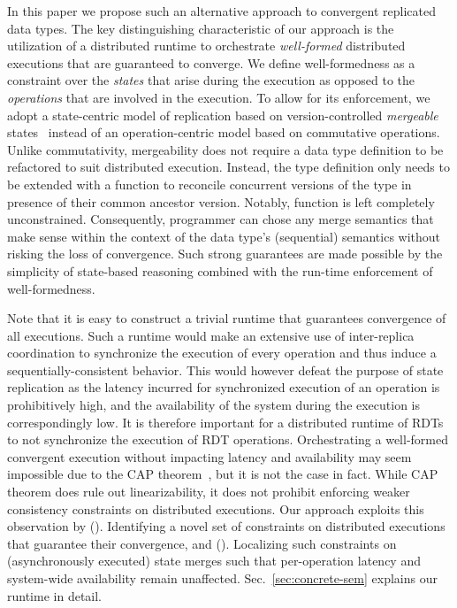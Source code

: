 In this paper we propose such an alternative approach to convergent
replicated data types. The key distinguishing characteristic of our
approach is the utilization of a distributed runtime to orchestrate
\emph{well-formed} distributed executions that are guaranteed to
converge. We define well-formedness as a constraint over the
\emph{states} that arise during the execution as opposed to the
\emph{operations} that are involved in the execution. To allow for its
enforcement, we adopt a state-centric model of replication based on
version-controlled \emph{mergeable} states~\cite{mrdt} instead of an
operation-centric model based on commutative operations. Unlike
commutativity, mergeability does not require a data type definition to
be refactored to suit distributed execution. Instead, the type
definition only needs to be extended with a  function to
reconcile concurrent versions of the type in presence of their common
ancestor version. Notably,  function is left completely
unconstrained. Consequently, programmer can chose any merge semantics
that make sense within the context of the data type's (sequential)
semantics without risking the loss of convergence. Such strong
guarantees are made possible by the simplicity of state-based
reasoning combined with the run-time enforcement of well-formedness. 


Note that it is easy to construct a trivial runtime that guarantees
convergence of all executions.  Such a runtime would make an extensive
use of inter-replica coordination to synchronize the execution of
every operation and thus induce a sequentially-consistent behavior.
This would however defeat the purpose of state replication as the
latency incurred for synchronized execution of an operation is
prohibitively high, and the availability of the system during the
execution is correspondingly low. It is therefore important for a
distributed runtime of RDTs to not synchronize the execution of RDT
operations. Orchestrating a well-formed convergent execution without
impacting latency and availability may seem impossible due to the CAP
theorem~\cite{cap}, but it is not the case in fact. While CAP theorem
does rule out linearizability, it does not prohibit enforcing weaker
consistency constraints on distributed executions. Our approach
exploits this observation by (). Identifying a novel set of
constraints on distributed executions that guarantee their
convergence, and (). Localizing such constraints on
(asynchronously executed) state merges such that per-operation latency
and system-wide availability remain unaffected.
Sec.~\ref{sec:concrete-sem} explains our runtime in detail.

